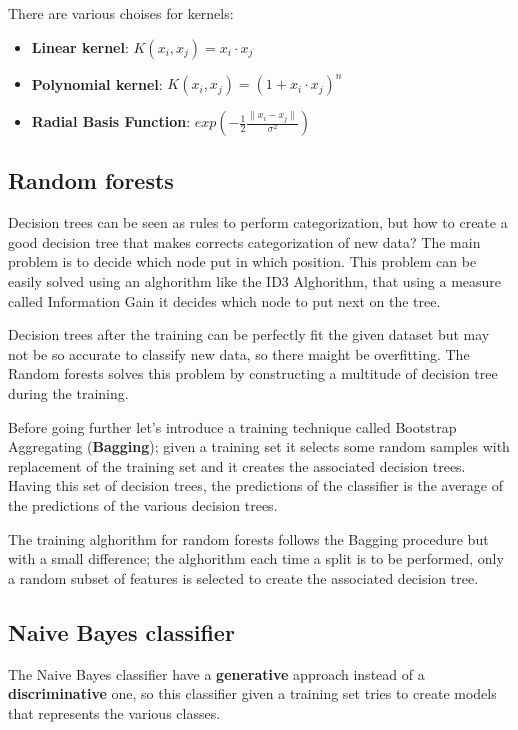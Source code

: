 \documentclass[12pt]{article}
\begin{document}
There are various choises for kernels:
\begin{itemize}
    \item \textbf{Linear kernel}: $K(x_i, x_j) = x_i \cdot x_j$
    \item \textbf{Polynomial kernel}: $K(x_i, x_j) = (1 + x_i \cdot x_j)^n$
    \item \textbf{Radial Basis Function}: $exp(- \frac{1}{2} \frac{\|x_i-x_j\|}{\sigma^2})$
\end{itemize}

\subsection{Random forests}

Decision trees can be seen as rules to perform categorization, but how to create a
good decision tree that makes corrects categorization of new data? The main
problem is to decide which node put in which position. This problem can be easily
solved using an alghorithm like the ID3 Alghorithm, that using a measure 
called Information Gain it decides which node to put next on the tree.

Decision trees after the training can be perfectly fit the given dataset but may
not be so accurate to classify new data, so there maight be overfitting.
The Random forests solves this problem by constructing a multitude of 
decision tree during the training.

Before going further let's introduce a training technique called 
Bootstrap Aggregating (\textbf{Bagging}); given a training set it 
selects some random samples with replacement of the training set and it creates the 
associated decision trees. Having this set of decision trees, the predictions of the 
classifier is the average of the predictions of the various decision trees.

The training alghorithm for random forests follows the 
Bagging procedure but with a small difference; the 
alghorithm each time a split is to be performed, only a random subset of features is
selected to create the associated decision tree. 

\subsection{Naive Bayes classifier}

The Naive Bayes classifier have a \textbf{generative} approach instead of a 
\textbf{discriminative} one,
so this classifier given a training set tries to create models that represents the
various classes.
 
\end{document}
